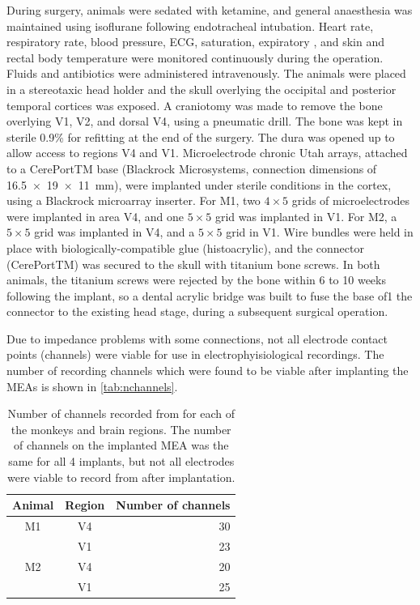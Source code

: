 During surgery, animals were sedated with ketamine, and general anaesthesia was maintained using isoflurane following endotracheal intubation.
Heart rate, respiratory rate, blood pressure, \ac{ECG},  saturation, expiratory , and skin and rectal body temperature were monitored continuously during the operation.
Fluids and antibiotics were administered intravenously.
The animals were placed in a stereotaxic head holder and the skull overlying the occipital and posterior temporal cortices was exposed.
A craniotomy was made to remove the bone overlying \ac{V1}, V2, and dorsal \ac{V4}, using a pneumatic drill.
The bone was kept in sterile 0.9\%  for refitting at the end of the surgery.
The dura was opened up to allow access to regions \ac{V4} and \ac{V1}.
Microelectrode chronic Utah arrays, attached to a CerePortTM base (Blackrock Microsystems, connection dimensions of \SI{16.5 x 19 x 11}{\milli\metre}), were implanted under sterile conditions in the cortex, using a Blackrock microarray inserter.
For \ac{M1}, two $4{\times}5$ grids of microelectrodes were implanted in area \ac{V4}, and one $5{\times}5$ grid was implanted in \ac{V1}.
For \ac{M2}, a $5{\times}5$ grid was implanted in \ac{V4}, and a $5{\times}5$ grid in \ac{V1}.
Wire bundles were held in place with biologically-compatible glue (histoacrylic), and the connector (CerePortTM) was secured to the skull with titanium bone screws.
In both animals, the titanium screws were rejected by the bone within 6 to 10 weeks following the implant, so a dental acrylic bridge was built to fuse the base of1 the connector to the existing head stage, during a subsequent surgical operation.

Due to impedance problems with some connections, not all electrode contact points (channels) were viable for use in electrophyisiological recordings.
The number of recording channels which were found to be viable after implanting the \acp{MEA} is shown in \autoref{tab:nchannels}.

\begin{table}[hbtp]
\caption{Number of channels recorded from for each of the monkeys and brain regions.
The number of channels on the implanted \ac{MEA} was the same for all 4 implants, but not all electrodes were viable to record from after implantation.}
\label{tab:nchannels}
\begin{center}
\begin{tabular}{ccr}
\toprule
Animal  & Region    & Number of channels \\
\midrule
M1      & V4        & 30 \\
        & V1        & 23 \\
M2      & V4        & 20 \\
        & V1        & 25 \\
\bottomrule
\end{tabular}
\end{center}
\end{table}

